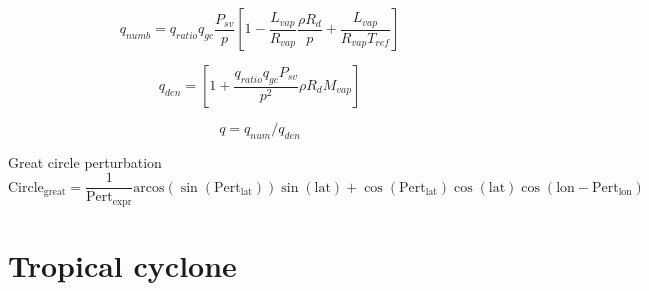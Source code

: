 \documentclass{article}
\begin{document}
\begin{equation}
 q_{numb}=q_{ratio}q_{gc}\frac{P_{sv}}{p}\left[1-\frac{L_{vap}}{R_{vap}}\frac{\rho R_d}{p} + \frac{L_{vap}}{R_{vap} T_{ref}} \right]
\end{equation}

\begin{equation}
 q_{den}=\left[1+\frac{q_{ratio}q_{gc}P_{sv}}{p^2}\rho R_d M_{vap} \right]
\end{equation}

\begin{equation}
 q=q_{num}/q_{den}
\end{equation}

Great circle perturbation \\
\begin{equation*}
\text{Circle}_{\text{great}}=\frac{1}{\text{Pert}_{\text{expr}}}\text{arcos}(\sin(\text{Pert}_{\text{lat}}))\sin(\text{lat})+\cos(\text{Pert}_{\text{lat}})\cos(\text{lat})\cos(\text{lon}-\text{Pert}_{\text{lon}})
\end{equation*}


\clearpage 



\section{Tropical cyclone}
\end{document}
